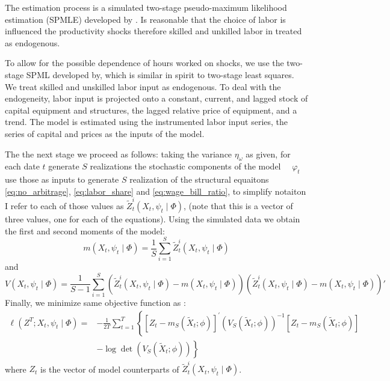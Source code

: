 \documentclass[12pt]{article}
\begin{document}
The estimation process is a simulated two-stage pseudo-maximum likelihood estimation (SPMLE) developed by \citep{white1996estimation}. Is reasonable that the choice of labor is influenced the productivity shocks therefore skilled and unkilled labor in treated as endogenous. 

To allow for the possible dependence of hours worked on shocks, we use the two-stage SPML developed by, which is similar in spirit to two-stage least squares. We treat skilled and unskilled labor input as endogenous. To deal with the endogeneity, labor input is projected onto a constant, current, and lagged stock of capital equipment and structures, the lagged relative price of equipment, and a trend. The model is estimated using the instrumented labor input series, the series of capital and prices as the inputs of the model.

The the next stage we proceed as follows: taking the variance $\eta_\omega$ as given, for each date $t$ generate $S$ realizations the stochastic components of the model $\quad \varphi_t$ use those as inputs to generate $S$ realization of the structural equaitons \eqref{eq:no_arbitrage}, \eqref{eq:labor_share} and \eqref{eq:wage_bill_ratio}, to simplify notaiton I refer to each of those values as $\tilde{Z}^{i}_t(X_{t}, \psi_{t} \mid \Phi)$, (note that this is a vector of three values, one for each of the equations). Using the simulated data we obtain the first and second moments of the model: 
\begin{equation}\label{eq:first_moment}
  m(X_{t}, \psi_{t} \mid \Phi) = \frac{1}{S}\sum_{i=1}^S \tilde{Z}^{i}_t(X_{t}, \psi_{t} \mid \Phi)
\end{equation}
and
\begin{equation}\label{eq:second_moment}
  V(X_{t}, \psi_{t} \mid \Phi) = \frac{1}{S-1}\sum_{i=1}^S \left( \tilde{Z}^{i}_t(X_{t}, \psi_{t} \mid \Phi) - m(X_{t}, \psi_{t} \mid \Phi) \right) \left( \tilde{Z}^{i}_t(X_{t}, \psi_{t} \mid \Phi) - m(X_{t}, \psi_{t} \mid \Phi) \right)'
\end{equation}
Finally, we minimize same objective function as \citep{krusell2000capital}:
\begin{equation}\label{eq:objective_funct_estimation}
  \begin{aligned}
    \ell\left(Z^{T} ; X_{t}, \psi_{t} \mid \Phi\right)=&-\frac{1}{2 T} \sum_{t=1}^{T}\left\{\left[Z_{t}-m_{S}\left(\tilde{X}_{t} ; \phi\right)\right]^{\prime}\left(V_{S}\left(\tilde{X}_{t} ; \phi\right)\right)^{-1}\left[Z_{t}-m_{S}\left(\tilde{X}_{t} ; \phi\right)\right]\right.\\
    &\left.-\log \operatorname{det}\left(V_{S}\left(\tilde{X}_{t} ; \phi\right)\right)\right\}
    \end{aligned}    
\end{equation}
where $Z_{t}$ is the vector of model counterparts of $\tilde{Z}^{i}_t(X_{t}, \psi_{t} \mid \Phi)$.
\end{document}
